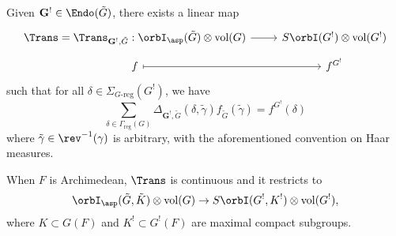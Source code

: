 \documentclass[12pt, a3paper, openany]{book}
\begin{document}
\begin{theorem}{}{}
	Given $\mathbf{G}^! \in \Endo(\tilde{G})$, there exists a linear map
	\[\begin{tikzcd}[row sep=tiny]
		\Trans = \Trans_{\mathbf{G}^!, \tilde{G}}: \orbI_{\asp}(\tilde{G}) \otimes \mes(G) \arrow[r] & S\orbI(G^!) \otimes \mes(G^!)\\
		f \arrow[mapsto, r]& f^{G^!}
	\end{tikzcd}\]
	such that for all $\delta \in \Sigma_{G\text{-reg}}(G^!)$, we have
	\[ \sum_{\delta \in \Gamma_{\mathrm{reg}}(G)} \Delta_{\mathbf{G}^!, \tilde{G}}(\delta, \tilde{\gamma}) f_{\tilde{G}}(\tilde{\gamma}) = f^{G^!}(\delta) \]
	where $\tilde{\gamma} \in \rev^{-1}(\gamma)$ is arbitrary, with the aforementioned convention on Haar measures.
	
	When $F$ is Archimedean, $\Trans$ is continuous and it restricts to
	\[ \orbI_{\asp}(\tilde{G}, \tilde{K}) \otimes \mes(G) \to S\orbI(G^!, K^!) \otimes \mes(G^!), \]
	where $K \subset G(F)$ and $K^! \subset G^!(F)$ are maximal compact subgroups.
\end{theorem}
\begin{skPf}    
\end{skPf}
\end{document}
